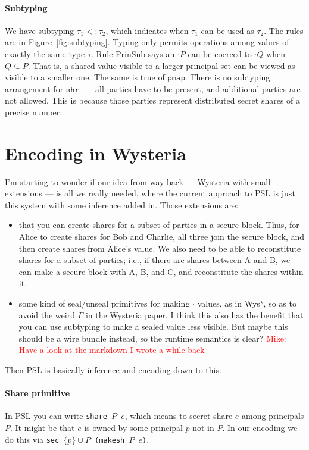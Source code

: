 \documentclass[10pt]{article}
\newcommand{\ssec}{\ensuremath{\mathtt{\cdot}}}
\newcommand{\isec}{\ensuremath{\mathtt{pmap}}}
\newcommand{\sshare}[1]{\ensuremath{\mathtt{shr}~{#1}}}
\newcommand{\subtype}{\ensuremath{<:}}
\newcommand{\issub}[2]{{#1} \subtype {#2}}
\newcommand{\mwh}[1]{\textcolor{red}{Mike: #1}}
\begin{document}
\paragraph{Subtyping}

We have subtyping $\issub{\tau_1}{\tau_2}$, which indicates when
$\tau_1$ can be used as $\tau_2$. The rules are in
Figure~\ref{fig:subtyping}. Typing only permits operations among
values of exactly the same type $\tau$. Rule PrinSub says an \ssec $P$
can be coerced to \ssec $Q$ when $Q \subseteq P$. That is, a shared
value visible to a larger principal set can be viewed as visible to a
smaller one. The same is true of \isec. There is no subtyping
arrangement for \sshare---all parties have to be present, and
additional parties are not allowed. This is because those parties
represent distributed secret shares of a precise number.


\section{Encoding in Wysteria}

I'm starting to wonder if our idea from way back --- Wysteria with
small extensions --- is all we really needed, where the current approach
to PSL is just this system with some inference added in. Those
extensions are:
\begin{itemize}
\item that you can create shares for a subset of parties in a secure
  block. Thus, for Alice to create shares for Bob and Charlie, all
  three join the secure block, and then create shares from Alice's
  value. We also need to be able to reconstitute shares for a subset
  of parties; i.e., if there are shares between A and B, we can make a
  secure block with A, B, and C, and reconstitute the shares within
  it. 
\item some kind of seal/unseal primitives for making $\ssec$ values, as
in Wys$^\star$, so as to avoid the weird $\Gamma$ in the Wysteria
paper. I think this also has the benefit that you can use subtyping to
make a sealed value less visible. But maybe this should be a wire
bundle instead, so the runtime semantics is clear?
\mwh{Have a look at the markdown I wrote a while back}
\end{itemize}

Then PSL is basically inference and encoding down to this.

\paragraph{Share primitive} In PSL you can write \texttt{share $P$
  $e$}, which means to secret-share $e$ among principals $P$. It might
be that $e$ is owned by some principal $p$ not in $P$. In our encoding
we do this via \texttt{sec $\{p\}\cup{P}$ (makesh $P$ $e$)}.
\end{document}
